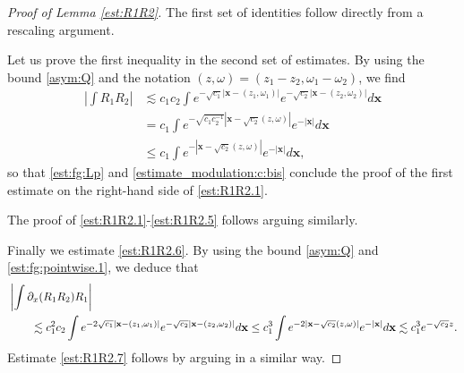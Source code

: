 \documentclass[reqno,10pt]{amsart}
\numberwithin{equation}{section}
\newcommand{\bx}{\mathbf{x}}
\begin{document}
	\begin{proof}[Proof of Lemma \ref{est:R1R2}]
		The first set of identities follow directly from a rescaling argument. 
		
		Let us prove the first inequality in the second set of estimates. 
		By using the bound \eqref{asym:Q} and the notation $(z,\omega)=(z_1-z_2,\omega_1-\omega_2)$, we find  
		\begin{align*} 
			\left| \int R_1 R_2 \right| & \lesssim c_1c_2 \int e^{-\sqrt{c_1}|\bx-(z_1,\omega_1)|}e^{-\sqrt{c_2}|\bx-(z_2,\omega_2)|}d\bx  \\ 
			&=c_1 \int e^{-\sqrt{c_1c_2^{-1}}|\bx-\sqrt{c_2}(z,\omega)|}e^{-|\bx|} d\bx \\
			& \le c_1 \int e^{-|\bx-\sqrt{c_2}(z,\omega)|}e^{-|\bx|} d\bx , 
		\end{align*}
		so that \eqref{est:fg:Lp} and 
  \eqref{estimate_modulation:c:bis} conclude the proof of the first estimate on the right-hand side of \eqref{est:R1R2.1}.
		
		The proof of \eqref{est:R1R2.1}-\eqref{est:R1R2.5} follows arguing similarly.
		
		Finally we estimate \eqref{est:R1R2.6}. By using the bound \eqref{asym:Q} and \eqref{est:fg:pointwise.1}, we deduce that
		\begin{align*}
			\MoveEqLeft
			\left\vert \int \partial_x(R_1 R_2) R_1 \right\vert \\ & \lesssim c_1^2 c_2 \int e^{-2\sqrt{c_1}|\bx-(z_1,\omega_1)|}e^{-\sqrt{c_2}|\bx-(z_2,\omega_2)|}d\bx   \le c_1^3 \int e^{-2|\bx-\sqrt{c_2}(z,\omega)|}e^{-|\bx|} d\bx \lesssim c_1^3 e^{-\sqrt{c_2} z} .
		\end{align*}
		Estimate \eqref{est:R1R2.7} follows by arguing in a similar way.
	\end{proof}
\end{document}
